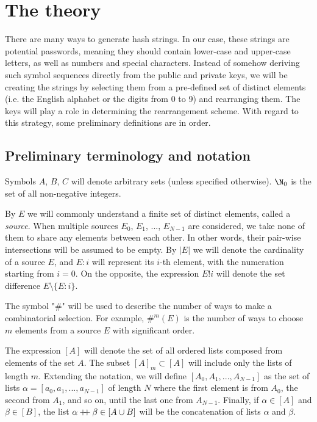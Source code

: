 \documentclass[12pt, a4paper]{article}
\newcommand{\dop}{\mathbin{{+}\hspace{-1mm}{+}}}
\newcommand{\elt}{\mathop{:}}
\newcommand{\wo}{\mathop{!}}
\begin{document}
\section{The theory}

There are many ways to generate hash strings. In our case, these strings are potential passwords, meaning they should contain lower-case and upper-case letters, as well as numbers and special characters. Instead of somehow deriving such symbol sequences directly from the public and private keys, we will be creating the strings by selecting them from a pre-defined set of distinct elements (i.e. the English alphabet or the digits from 0 to 9) and rearranging them. The keys will play a role in determining the rearrangement scheme. With regard to this strategy, some preliminary definitions are in order.

\subsection{Preliminary terminology and notation}

Symbols $ A $, $ B $, $ C $ will denote arbitrary sets (unless specified otherwise). $ \N_0 $ is the set of all non-negative integers.

By $ E $ we will commonly understand a finite set of distinct elements, called a \emph{source}. When multiple sources $ E_0 $, $ E_1 $, ..., $ E_{N-1} $ are considered, we take none of them to share any elements between each other. In other words, their pair-wise intersections will be assumed to be empty. By $ |E| $ we will denote the cardinality of a source $ E $, and $ E \elt i $ will represent its $ i $-th element, with the numeration starting from $ i = 0 $. On the opposite, the expression $ E \wo i $ will denote the set difference $ E \setminus \{E \elt i\} $.

The symbol "$ \# $" will be used to describe the number of ways to make a combinatorial selection. For example, $ \#^m(E) $ is the number of ways to choose $ m $ elements from a source $ E $ with significant order.

The expression $ [A] $ will denote the set of all ordered lists composed from elements of the set $ A $. The subset $ [A]_m \subset [A] $ will include only the lists of length $ m $. Extending the notation, we will define $ [A_0, A_1, ..., A_{N-1}] $ as the set of lists $ \alpha = [a_0, a_1, ..., a_{N-1}] $ of length $ N $ where the first element is from $ A_0 $, the second from $ A_1 $, and so on, until the last one from $ A_{N-1} $. Finally, if $ \alpha \in [A] $ and $ \beta \in [B] $, the list $ \alpha \dop \beta \in [A \cup B] $ will be the concatenation of lists $ \alpha $ and $ \beta $.
\end{document}
